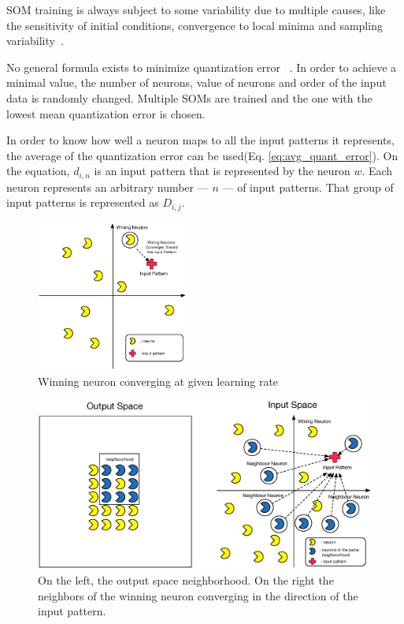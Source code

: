 SOM training is always subject to some variability due to multiple causes, like the sensitivity of initial conditions, convergence to local minima and sampling variability~\cite{Bodt}.

No general formula exists to minimize quantization error~\cite{Bodt} . In order to achieve a minimal value, the number of neurons, value of neurons and order of the input data is randomly changed. Multiple SOMs are trained and the one with the lowest mean quantization error is chosen.

In order to know how well a neuron maps to all the input patterns it represents, the average of the quantization error can be used(Eq. \ref{eq:avg_quant_error}). On the equation, $d_{i,n}$ is an input pattern that is represented by the neuron $w$. Each neuron represents an arbitrary number --- $n$ --- of input patterns. That group of input patterns is represented as $D_{i,j}$.
\par





\begin{figure}
  \begin{center}
    \includegraphics[width=5cm]{images/4_wining_neuron_converge.eps}
  \end{center}
  \caption{ Winning neuron converging at given learning rate }
  \label{fig:4_wining_neuron_converge}
\end{figure}

\begin{figure}
  \begin{center}
    \includegraphics[width=12cm]{images/5_neighbours_converge.eps}
  \end{center}
  \caption{ On the left, the output space neighborhood. On the right the neighbors of the winning neuron converging in the direction of the input pattern. }
  \label{fig:5_neighbours_converge}
\end{figure}

